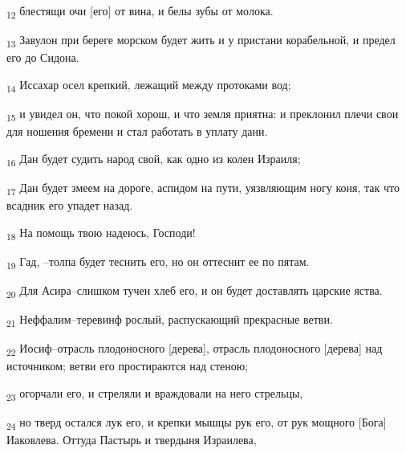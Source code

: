 \begin{tcolorbox}
\textsubscript{12} блестящи очи [его] от вина, и белы зубы от молока.
\end{tcolorbox}
\begin{tcolorbox}
\textsubscript{13} Завулон при береге морском будет жить и у пристани корабельной, и предел его до Сидона.
\end{tcolorbox}
\begin{tcolorbox}
\textsubscript{14} Иссахар осел крепкий, лежащий между протоками вод;
\end{tcolorbox}
\begin{tcolorbox}
\textsubscript{15} и увидел он, что покой хорош, и что земля приятна: и преклонил плечи свои для ношения бремени и стал работать в уплату дани.
\end{tcolorbox}
\begin{tcolorbox}
\textsubscript{16} Дан будет судить народ свой, как одно из колен Израиля;
\end{tcolorbox}
\begin{tcolorbox}
\textsubscript{17} Дан будет змеем на дороге, аспидом на пути, уязвляющим ногу коня, так что всадник его упадет назад.
\end{tcolorbox}
\begin{tcolorbox}
\textsubscript{18} На помощь твою надеюсь, Господи!
\end{tcolorbox}
\begin{tcolorbox}
\textsubscript{19} Гад, --толпа будет теснить его, но он оттеснит ее по пятам.
\end{tcolorbox}
\begin{tcolorbox}
\textsubscript{20} Для Асира--слишком тучен хлеб его, и он будет доставлять царские яства.
\end{tcolorbox}
\begin{tcolorbox}
\textsubscript{21} Неффалим--теревинф рослый, распускающий прекрасные ветви.
\end{tcolorbox}
\begin{tcolorbox}
\textsubscript{22} Иосиф--отрасль плодоносного [дерева], отрасль плодоносного [дерева] над источником; ветви его простираются над стеною;
\end{tcolorbox}
\begin{tcolorbox}
\textsubscript{23} огорчали его, и стреляли и враждовали на него стрельцы,
\end{tcolorbox}
\begin{tcolorbox}
\textsubscript{24} но тверд остался лук его, и крепки мышцы рук его, от рук мощного [Бога] Иаковлева. Оттуда Пастырь и твердыня Израилева,
\end{tcolorbox}
